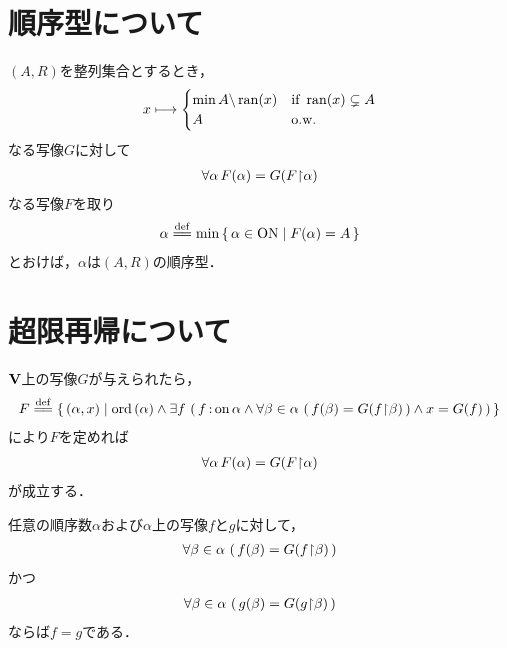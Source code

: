 	
\section{順序型について}
	$(A,R)$を整列集合とするとき，
	\begin{align}
		x \longmapsto 
		\begin{cases}
			\min{A \backslash \operatorname*{ran} (x)} & \mbox{if } \operatorname*{ran} (x) \subsetneq A \\
			A & \mbox{o.w.} \\
		\end{cases}
	\end{align}
	なる写像$G$に対して
	\begin{align}
		\forall \alpha\, F(\alpha) = G(F\hspace{-0.25em}\upharpoonright\hspace{-0.25em}{\alpha})
	\end{align}
	なる写像$F$を取り
	\begin{align}
		\alpha \defeq \min{\Set{\alpha \in \ON}{F(\alpha) = A}}
	\end{align}
	とおけば，$\alpha$は$(A,R)$の順序型．
	
\section{超限再帰について}
	$\mathbf{V}$上の写像$G$が与えられたら，
	\begin{align}
		F \defeq \Set{(\alpha,x)}{\ord{\alpha} \wedge
		\exists f\, \left(\, f \fon \alpha \wedge
		\forall \beta \in \alpha\, \left(\, f(\beta) = G(\rest{f}{\beta})\, \right)
		\wedge x = G(f)\, \right)}
	\end{align}
	により$F$を定めれば
	\begin{align}
		\forall \alpha\, F(\alpha) = G(F\hspace{-0.25em}\upharpoonright\hspace{-0.25em}{\alpha})
	\end{align}
	が成立する．
	
	\begin{screen}
		任意の順序数$\alpha$および$\alpha$上の写像$f$と$g$に対して，
		\begin{align}
			\forall \beta \in \alpha\,
			\left(\, f(\beta) = G(f\hspace{-0.25em}\upharpoonright\hspace{-0.25em}{\beta})\, \right)
		\end{align}
		かつ
		\begin{align}
			\forall \beta \in \alpha\,
			\left(\, g(\beta) = G(g\hspace{-0.25em}\upharpoonright\hspace{-0.25em}{\beta})\, \right)
		\end{align}
		ならば$f = g$である．
	\end{screen}
	
